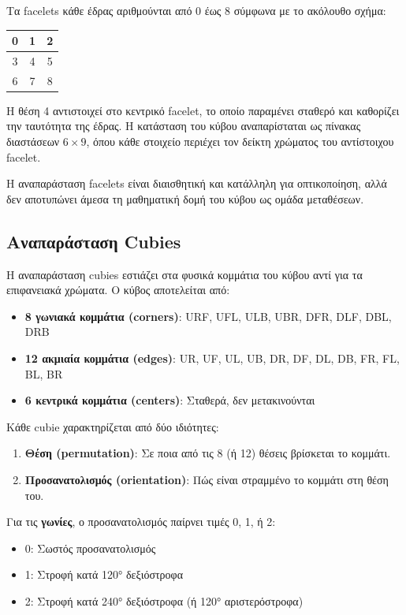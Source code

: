 Τα facelets κάθε έδρας αριθμούνται από 0 έως 8 σύμφωνα με το ακόλουθο σχήμα:

\begin{center}
\begin{tabular}{|c|c|c|}
\hline
0 & 1 & 2 \\
\hline
3 & 4 & 5 \\
\hline
6 & 7 & 8 \\
\hline
\end{tabular}
\end{center}

Η θέση 4 αντιστοιχεί στο κεντρικό facelet, το οποίο παραμένει σταθερό και καθορίζει την ταυτότητα της έδρας. Η κατάσταση του κύβου αναπαρίσταται ως πίνακας διαστάσεων $6 \times 9$, όπου κάθε στοιχείο περιέχει τον δείκτη χρώματος του αντίστοιχου facelet.

Η αναπαράσταση facelets είναι διαισθητική και κατάλληλη για οπτικοποίηση, αλλά δεν αποτυπώνει άμεσα τη μαθηματική δομή του κύβου ως ομάδα μεταθέσεων.

\subsection{Αναπαράσταση Cubies}
\label{subsec:cubie_repr}

Η αναπαράσταση cubies εστιάζει στα φυσικά κομμάτια του κύβου αντί για τα επιφανειακά χρώματα. Ο κύβος αποτελείται από:

\begin{itemize}
    \item \textbf{8 γωνιακά κομμάτια (corners)}: URF, UFL, ULB, UBR, DFR, DLF, DBL, DRB
    \item \textbf{12 ακμιαία κομμάτια (edges)}: UR, UF, UL, UB, DR, DF, DL, DB, FR, FL, BL, BR
    \item \textbf{6 κεντρικά κομμάτια (centers)}: Σταθερά, δεν μετακινούνται
\end{itemize}

Κάθε cubie χαρακτηρίζεται από δύο ιδιότητες:

\begin{enumerate}
    \item \textbf{Θέση (permutation)}: Σε ποια από τις 8 (ή 12) θέσεις βρίσκεται το κομμάτι.
    \item \textbf{Προσανατολισμός (orientation)}: Πώς είναι στραμμένο το κομμάτι στη θέση του.
\end{enumerate}

Για τις \textbf{γωνίες}, ο προσανατολισμός παίρνει τιμές 0, 1, ή 2:
\begin{itemize}
    \item 0: Σωστός προσανατολισμός
    \item 1: Στροφή κατά 120° δεξιόστροφα
    \item 2: Στροφή κατά 240° δεξιόστροφα (ή 120° αριστερόστροφα)
\end{itemize}

